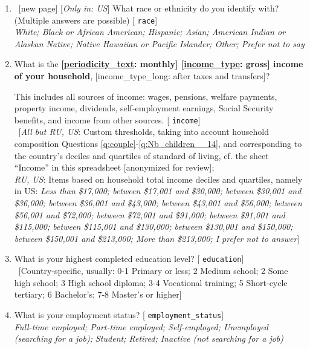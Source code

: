 \begin{enumerate}[resume]
\item ~[new page] \label{q:race} [\textit{Only in: US}] What race or ethnicity do you identify with? (Multiple answers are possible) [%
\verb|race|]
  \\ \textit{White; Black or African American; Hispanic; Asian; American Indian or Alaskan Native; Native Hawaiian or Pacific Islander; Other; Prefer not to say}

\item  \label{q:income} What is the \textbf{[\hyperlink{tab_features}{periodicity\_text}: monthly] [\hyperlink{tab_features}{income\_type}: gross] income of your household}, [income\_type\_long: after taxes and transfers]?

This includes all sources of income: wages, pensions, welfare payments, property income, dividends, self-employment earnings, Social Security benefits, and income from other sources. [%
\verb|income|]
  \\ ~[\textit{All but RU, US}: Custom thresholds, taking into account household composition Questions \ref{q:couple}-\ref{q:Nb_children__14}, and corresponding to the country's deciles and quartiles of standard of living, cf. the sheet ``Income'' in this spreadsheet [anonymized for review]; \\ \textit{RU, US}: Items based on household total income deciles and quartiles, namely in US: \textit{Less than \$17,000; between \$17,001 and \$30,000; between \$30,001 and \$36,000; between \$36,001 and \$43,000; between \$43,001 and \$56,000; between \$56,001 and \$72,000; between \$72,001 and \$91,000; between \$91,001 and \$115,000; between \$115,001 and \$130,000; between \$130,001 and \$150,000; between \$150,001 and \$213,000; More than \$213,000; I prefer not to answer}]  %

\item  \label{q:education} What is your highest completed education level? [%
\verb|education|]
  \\ ~[Country-specific, usually: 0-1 Primary or less; 2 Medium school; 2 Some high school; 3 High school diploma; 3-4 Vocational training; 5 Short-cycle tertiary; 6 Bachelor's; 7-8 Master's or higher]

\item  \label{q:employment_status} What is your employment status? [%
\verb|employment_status|]
  \\ \textit{Full-time employed; Part-time employed; Self-employed; Unemployed (searching for a job); Student; Retired; Inactive (not searching for a job)}


\end{enumerate}
